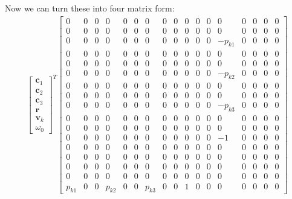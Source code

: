 \documentclass{article}
\newcommand{\mbf}[1]{\mathbf{#1}}
\begin{document}
Now we can turn these into four matrix form:
\begin{align}
    \begin{bmatrix}
        \mbf{c}_1 \\
        \mbf{c}_2 \\
        \mbf{c}_3 \\
        \mbf{r} \\
        \mbf{v}_k \\
        \omega_0
    \end{bmatrix}^T 
    \begin{bmatrix}
        0 & 0 & 0 & 0 & 0 & 0 & 0 & 0 & 0 & 0 & 0 & 0 & 0 & 0 & 0 & 0 & 0 \\
        0 & 0 & 0 & 0 & 0 & 0 & 0 & 0 & 0 & 0 & 0 & 0 & 0 & 0 & 0 & 0 & 0 \\
        0 & 0 & 0 & 0 & 0 & 0 & 0 & 0 & 0 & 0 & 0 & 0 & -p_{k1} & 0 & 0 & 0 & 0 \\
        0 & 0 & 0 & 0 & 0 & 0 & 0 & 0 & 0 & 0 & 0 & 0 & 0 & 0 & 0 & 0 & 0 \\
        0 & 0 & 0 & 0 & 0 & 0 & 0 & 0 & 0 & 0 & 0 & 0 & 0 & 0 & 0 & 0 & 0 \\
        0 & 0 & 0 & 0 & 0 & 0 & 0 & 0 & 0 & 0 & 0 & 0 & -p_{k2} & 0 & 0 & 0 & 0 \\
        0 & 0 & 0 & 0 & 0 & 0 & 0 & 0 & 0 & 0 & 0 & 0 & 0 & 0 & 0 & 0 & 0 \\
        0 & 0 & 0 & 0 & 0 & 0 & 0 & 0 & 0 & 0 & 0 & 0 & 0 & 0 & 0 & 0 & 0 \\
        0 & 0 & 0 & 0 & 0 & 0 & 0 & 0 & 0 & 0 & 0 & 0 & -p_{k3} & 0 & 0 & 0 & 0 \\
        0 & 0 & 0 & 0 & 0 & 0 & 0 & 0 & 0 & 0 & 0 & 0 & 0 & 0 & 0 & 0 & 0 \\
        0 & 0 & 0 & 0 & 0 & 0 & 0 & 0 & 0 & 0 & 0 & 0 & 0 & 0 & 0 & 0 & 0 \\
        0 & 0 & 0 & 0 & 0 & 0 & 0 & 0 & 0 & 0 & 0 & 0 & -1 & 0 & 0 & 0 & 0 \\
        0 & 0 & 0 & 0 & 0 & 0 & 0 & 0 & 0 & 0 & 0 & 0 & 0 & 0 & 0 & 0 & 0 \\
        0 & 0 & 0 & 0 & 0 & 0 & 0 & 0 & 0 & 0 & 0 & 0 & 0 & 0 & 0 & 0 & 0 \\
        0 & 0 & 0 & 0 & 0 & 0 & 0 & 0 & 0 & 0 & 0 & 0 & 0 & 0 & 0 & 0 & 0 \\
        0 & 0 & 0 & 0 & 0 & 0 & 0 & 0 & 0 & 0 & 0 & 0 & 0 & 0 & 0 & 0 & 0 \\
        p_{k1} & 0 & 0 & p_{k2} & 0 & 0 & p_{k3} & 0 & 0 & 1 & 0 & 0 & 0 & 0 & 0 & 0 & 0
    \end{bmatrix}

\end{align}
\end{document}
